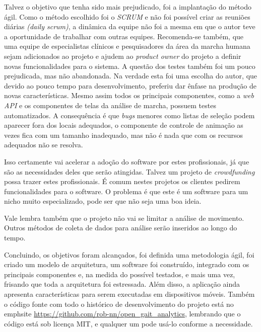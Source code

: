 Talvez o objetivo que tenha sido mais prejudicado, foi a implantação do método ágil. 
Como o método escolhido foi o \emph{SCRUM} e não foi possível criar as reuniões diárias \emph{(daily scrum)}, a dinâmica da equipe não foi a mesma em que o autor teve a oportunidade de trabalhar com outras equipes.
Recomenda-se também, que uma equipe de especialistas clínicos e pesquisadores da área da marcha humana sejam adicionados ao projeto e ajudem ao \emph{product owner} do projeto a definir novas funcionalidades para o sistema. 
A questão dos testes também foi um pouco prejudicada, mas não abandonada. Na verdade esta foi uma escolha do autor, que devido ao pouco tempo para desenvolvimento, preferiu dar ênfase na produção de novas características. Mesmo assim todos os principais componentes, como a \emph{web API} e os componentes de telas da análise de marcha, possuem testes automatizados.
A consequência é que \emph{bugs} menores como listas de seleção podem aparecer fora dos locais adequados, o componente de controle de animação as vezes fica com um tamanho inadequado, mas não é nada que com os recursos adequados não se resolva.

Isso certamente vai acelerar a adoção do software por estes profissionais, já que são as necessidades deles que serão atingidas.
Talvez um projeto de \emph{crowdfunding} possa trazer estes profissionais. 
É comum nestes projetos os clientes pedirem funcionalidades para o software.
O problema é que este é um software para um nicho muito especializado, pode ser que não seja uma boa ideia.

Vale lembra também que o projeto não vai se limitar a análise de movimento. Outros métodos de coleta de dados para análise serão inseridos ao longo do tempo.


Concluindo, os objetivos foram alcançados, foi definida uma metodologia ágil, foi criado um modelo de arquitetura, um software foi construído, integrado com os principais componentes e, na medida do possível testados, e mais uma vez, frisando que toda a arquitetura foi estressada. 
Além disso, a aplicação ainda apresenta características para serem executadas em dispositivos móveis. 
Também o código fonte com todo o histórico de desenvolvimento do projeto está no emph{site} \url{https://github.com/rob-nn/open\_gait\_analytics}, lembrando que o código está sob licença MIT, e qualquer um pode usá-lo conforme a necessidade.
